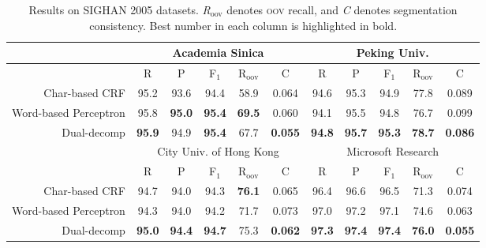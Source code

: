 \begin{table*}
\centering
\begin{small}
\begin{tabular}{ r | c | c | c | c | c | c | c | c | c | c  }
\multicolumn{1}{c|}{} & \multicolumn{5}{c|}{Academia Sinica} &  \multicolumn{5}{c}{Peking Univ.} \\
\hline
\multicolumn{1}{c}{}   & \multicolumn{1}{|c}{R} &  \multicolumn{1}{c}{P}     &  \multicolumn{1}{c}{F$_1$}   &    \multicolumn{1}{c}{R$_{\mathrm{oov}}$}   &   \multicolumn{1}{c}{C}  & \multicolumn{1}{|c}{R}  &  \multicolumn{1}{c}{P}   &  \multicolumn{1}{c}{F$_1$}   &   \multicolumn{1}{c}{R$_{\mathrm{oov}}$}  &   \multicolumn{1}{c}{C} \\ 
Char-based CRF    &  95.2 &   93.6  & 94.4  &  58.9 & 0.064                                               &  94.6             &    95.3 & 94.9  &   77.8   & 0.089    \\
Word-based Perceptron &  95.8 & \textbf{95.0} & \textbf{95.4}  & \textbf{69.5} & 0.060  &  94.1             & 95.5  & 94.8  &  76.7 & 0.099     \\ 
Dual-decomp      & \textbf{95.9} & 94.9   & \textbf{95.4}  & {67.7} & \textbf{0.055}            & \textbf{94.8} & \textbf{95.7} & \textbf{95.3}  &  \textbf{78.7} & \textbf{0.086}   \\
\multicolumn{1}{c|}{} &  \multicolumn{5}{c|}{City Univ. of Hong Kong} &  \multicolumn{5}{c}{Microsoft Research}  \\
\hline
\multicolumn{1}{c}{}   & \multicolumn{1}{|c}{R} &  \multicolumn{1}{c}{P}     &  \multicolumn{1}{c}{F$_1$}   &    \multicolumn{1}{c}{R$_{\mathrm{oov}}$}   &   \multicolumn{1}{c}{C}  & \multicolumn{1}{|c}{R}  &  \multicolumn{1}{c}{P}   &  \multicolumn{1}{c}{F$_1$}   &   \multicolumn{1}{c}{R$_{\mathrm{oov}}$}  &   \multicolumn{1}{c}{C} \\ 
Char-based CRF                 & 94.7 & 94.0 & 94.3  & \textbf{76.1}                            & 0.065             & 96.4 &              96.6 &             96.5  & 71.3 & 0.074 \\
Word-based Perceptron    & 94.3 & 94.0 & 94.2  & 71.7                                         & 0.073              &  97.0 &              97.2                & 97.1  & 74.6 & 0.063  \\
Dual-decomp                   & \textbf{95.0} & \textbf{94.4}  & \textbf{94.7}  & {75.3} & \textbf{0.062} & \textbf{97.3} &  \textbf{97.4} &  \textbf{97.4}  & \textbf{76.0} & \textbf{0.055}  \\
\end{tabular} 
\caption{Results on SIGHAN 2005 datasets. \textit{R$_{\mathrm{oov}}$}  denotes \textsc{oov} recall, and \textit{C} denotes segmentation consistency. Best number in each column is highlighted in bold.
}\label{tbl:results}
\end{small}
\end{table*}

